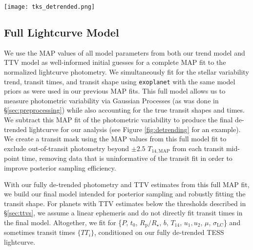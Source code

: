 \documentclass[twocolumn]{aastex63}
\begin{document}
\begin{figure*}[ht]
\centering
\texttt{[image: tks\_detrended.png]}
\caption{Before (top) and after (bottom) applying our de-trending and initial TTV fitting procedure to the photometry of TOI-1136, a multi-planet system with high stellar variability. We only show the first sector (Sector 14) of this target's photometry here, but all sectors display similar variability. We model our de-trended transit photometry and measure $R_\textrm{p}/R_\star$ values for all 4 planets which agree with the values reported by \citealt{Dai22} within $\sim$1.5$\sigma$, as opposed to the TOI Catalog values which are all more than 1.5$\sigma$ discrepant. Black points highlight transits ($\pm$0.75 times $T_{14}$), colored vertical dashed lines show modeled transit mid-points, and dark grey vertical dashed lines show calculated transit mid-points assuming a linear ephemeris. In the sector shown, we find the most significant TTVs for TOI-1136.03 (green) as can be seen by the separation between the modeled and calculated mid-points.}
\label{fig:detrending}
\end{figure*}


\subsection{Full Lightcurve Model}
\label{sec:fullmodel}

We use the MAP values of all model parameters from both our trend model and TTV model as well-informed initial guesses for a complete MAP fit to the normalized lightcurve photometry. We simultaneously fit for the stellar variability trend, transit times, and transit shape using \texttt{exoplanet} with the same model priors as were used in our previous MAP fits. This full model allows us to measure photometric variability via Gaussian Processes (as was done in \S\ref{sec:preprocessing}) while also accounting for the true transit shapes and times. We subtract this MAP fit of the photometric variability to produce the final de-trended lightcurve for our analysis (see Figure \ref{fig:detrending} for an example). We create a transit mask using the MAP values from this full model fit to exclude out-of-transit photometry beyond $\pm2.5$ $T_{14, \textrm{MAP}}$ from each transit mid-point time, removing data that is uninformative of the transit fit in order to improve posterior sampling efficiency.

With our fully de-trended photometry and TTV estimates from this full MAP fit, we build our final model intended for posterior sampling and robustly fitting the transit shape. For planets with TTV estimates below the thresholds described in \S\ref{sec:ttvs}, we assume a linear ephemeris and do not directly fit transit times in the final model. Altogether, we fit for \{$P$, $t_0$, $R_\textrm{p}/R_\star$, $b$, $T_{14}$, $u_1, u_2$, $\mu$, $\sigma_\textrm{LC}$\} and sometimes transit times $\{TT_{i}\}$, conditioned on our fully de-trended TESS lightcurve.
\end{document}
